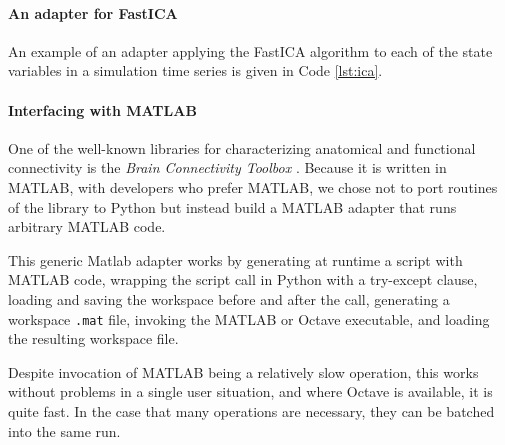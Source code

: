 \paragraph{An adapter for FastICA}

An example of an adapter applying the FastICA algorithm to each of the 
state variables in a simulation time series is given in Code \ref{lst:ica}.



\paragraph{Interfacing with MATLAB}

One of the well-known libraries for characterizing anatomical 
and functional connectivity is the \emph{Brain Connectivity Toolbox} 
\citep{Rubinov_2010}. 
Because it is written in MATLAB, with developers who prefer MATLAB, we 
chose not to port routines of the library to Python but instead build
a MATLAB adapter that runs arbitrary MATLAB code. 

This generic Matlab adapter works by generating at runtime a script with MATLAB code, 
wrapping the script call in Python with a try-except clause,  
loading and saving the workspace before and after the call,
generating a workspace \texttt{.mat} file, invoking the MATLAB or Octave
executable, and loading the resulting workspace file. 

Despite invocation of MATLAB being a relatively slow operation, this works
without problems in a single user situation, and where Octave is available, it
is quite fast. In the case that many operations are necessary, they can be
batched into the same run.
